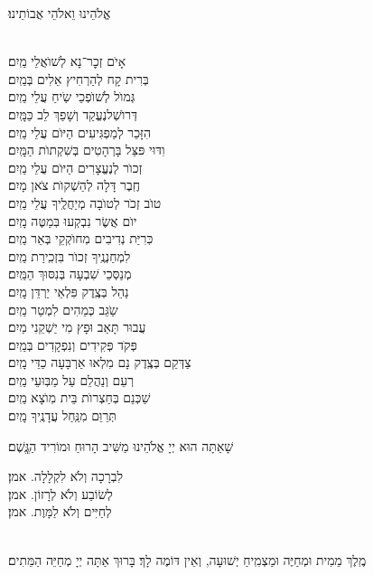 \documentclass[twoside, openany, parskip=half, 11pt]{book}
\begin{document}
\begin{small}אֱלֹהֵינוּ וֵאלֹהֵי אֲבוֹתֵינוּ׃\end{small}\\
אָיׂם זְכׇר־נָא לְשׁוׂאֲלֵי \hfill מַֽיִם׃\\
בְּרִית קָח לְהַרְחִיץ אֵלִים \hfill בְּמַֽיִם׃\\
גְּמוׂל לְשׁוׂפְכֵי שִֹֽיחַ עֲלֵי \hfill מַֽיִם׃\\
דְּרוׂשְׁלנֶעֱקַד וְשָׁפַךְ לֵב \hfill כַּמָּֽיִם׃\\
הִזָּכֵר לְמַפְגִּיעִים הַיּוׂם עֲלֵי \hfill מַֽיִם׃\\
וִדּוּי פּצֵּל בָּרְהָטִים בְּשִׁקְתוׂת \hfill הַמָּֽיִם׃\\
זְכוׂר לְנֶעֱצָרִים הַיּוׂם עֲלֵי \hfill מַֽיִם׃\\
חֶֽבֶר דָּלָה לְהַשְׁקוׂת צׂאן \hfill מָיִם׃\\
טוׂב זְכׂר לְטוׂבָה מְיַחֲלֶֽיךָ עֲלֵי \hfill מַֽיִם׃\\
יוׂם אֲשֶׂר נִבְקְעוּ בּֽמַטֶּה \hfill מָֽיִם׃\\
כּֽרִיַּת נְדִיבִים מֽחוׂקְקֵי בְּאֵר \hfill מַֽיִם׃\\
לִמְחַנְנֶֽיךָ זְכוׂר בִּזְכִֽירַת \hfill מַֽיִם׃\\
מְנַסְּכֵי שִׁבְעָה בְּנִסּוּךְ \hfill הַמַּֽיִם׃\\
נַהֵל בְּצֶֽדֶק פִּלְאֵי יַרְדֵּן \hfill מָֽיִם׃\\
שַֹגֵּב כְּמֵהִים לִמְטַר \hfill מַֽיִם׃\\
עֲבוּר תָּאַב וּפָץ מִי יַשְׁקֵנִי \hfill מַיִם׃\\
פְּקׂד פְּקִידִים וְנִפְקָדִים \hfill בְּמַֽיִם׃\\
צַדְּקֵם בְּצֶֽדֶק נָם מִלְאוּ אַרְבָּעָה כַדֵּי \hfill מָֽיִם׃\\
רְעֵם וְנַהֲלֵם עַל מַבּֽוּעֵי \hfill מַֽיִם׃\\
שַׁכְּנֵם בְּחַצְרוׂת בֵּית מֽוׂצָא \hfill מַֽיִם׃\\
תְּרַוֵּם מִנַּֽחַל עֲדָנֶֽיךָ \hfill מָֽיִם׃

שָׁאַתָּה הוּא יְיָ אֱלֹהֵינוּ מַשִּׁיב הָרוּחַ וּמוֹרִיד הַגֱּֽשֶׁם׃

לִבְרָכָה וְלֹא לִקְלָלָה. \hfill אמן׃\\
לְשׂוֹבַע וְלֹא לְרָזוֹן. \hfill אמן׃\\
לְחַיִּים וְלֹא לַמָּוֶת. \hfill אמן׃

\\
מֶֽלֶךְ מֵמִית וּמְחַיֶּה וּמַצְמִֽיחַ יְשׁוּעָה, וְאֵין דּוֹמֶה לָךְ׃ בָּרוּךְ אַתָּה יְיָ מְחַיֵּה הַמֵּתִים׃
\end{document}
